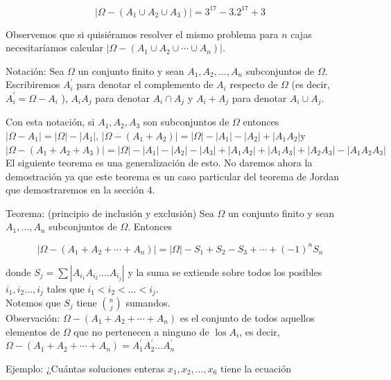 \documentclass[10pt]{article}
\begin{document}
$$
\left|\Omega-\left(A_{1} \cup A_{2} \cup A_{3}\right)\right|=3^{17}-3.2^{17}+3
$$

Observemos que si quisiéramos resolver el mismo problema para $n$ cajas necesitaríamos calcular $\left|\Omega-\left(A_{1} \cup A_{2} \cup \cdots \cup A_{n}\right)\right|$.

Notación: Sea $\Omega$ un conjunto finito y sean $A_{1}, A_{2}, \ldots, A_{n}$ subconjuntos de $\Omega$.\\
Escribiremos $A_{i}^{\prime}$ para denotar el complemento de $A_{i}$ respecto de $\Omega$ (es decir, $A_{i}^{\prime}=\Omega-A_{i}$ ), $A_{i} A_{j}$ para denotar $A_{i} \cap A_{j}$ y $A_{i}+A_{j}$ para denotar $A_{i} \cup A_{j}$.

Con esta notación, si $A_{1}, A_{2}, A_{3}$ son subconjuntos de $\Omega$ entonces $\left|\Omega-A_{1}\right|=|\Omega|-\left|A_{1}\right|$, $\left|\Omega-\left(A_{1}+A_{2}\right)\right|=|\Omega|-\left|A_{1}\right|-\left|A_{2}\right|+\left|A_{1} A_{2}\right| \mathrm{y}$\\
$\left|\Omega-\left(A_{1}+A_{2}+A_{3}\right)\right|=|\Omega|-\left|A_{1}\right|-\left|A_{2}\right|-\left|A_{3}\right|+\left|A_{1} A_{2}\right|+\left|A_{1} A_{3}\right|+\left|A_{2} A_{3}\right|-\left|A_{1} A_{2} A_{3}\right|$\\
El siguiente teorema es una generalización de esto. No daremos ahora la demostración ya que este teorema es un caso particular del teorema de Jordan que demostraremos en la sección 4.

Teorema: (principio de inclusión y exclusión) Sea $\Omega$ un conjunto finito y sean $A_{1}, \ldots, A_{n}$ subconjuntos de $\Omega$. Entonces

$$
\left|\Omega-\left(A_{1}+A_{2}+\cdots+A_{n}\right)\right|=|\Omega|-S_{1}+S_{2}-S_{3}+\cdots+(-1)^{n} S_{n}
$$

donde $S_{j}=\sum\left|A_{i_{1}} A_{i_{2}} \ldots . A_{i_{j}}\right|$ y la suma se extiende sobre todos los posibles $i_{1}, i_{2} \ldots, i_{j}$ tales que $i_{1}<i_{2}<\ldots<i_{j}$.\\
Notemos que $S_{j}$ tiene $\binom{n}{j}$ sumandos.\\
Observación: $\Omega-\left(A_{1}+A_{2}+\cdots+A_{n}\right)$ es el conjunto de todos aquellos elementos de $\Omega$ que no pertenecen a ninguno de $\operatorname{los} A_{i}$, es decir, $\Omega-\left(A_{1}+A_{2}+\cdots+A_{n}\right)=A_{1}^{\prime} A_{2}^{\prime} \ldots A_{n}^{\prime}$

Ejemplo: ¿Cuántas soluciones enteras $x_{1}, x_{2}, \ldots, x_{6}$ tiene la ecuación
\end{document}
